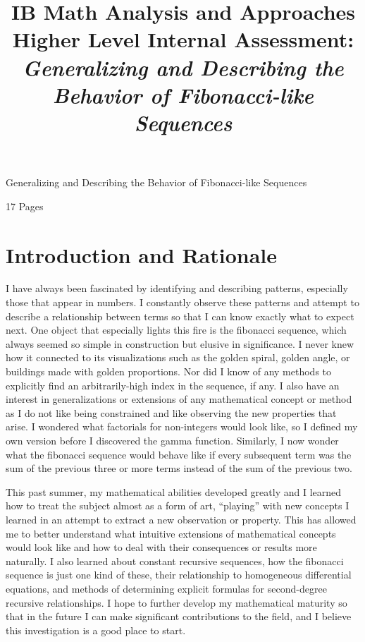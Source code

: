 \documentclass[11pt]{article}
\title{IB Math Analysis and Approaches Higher Level Internal Assessment: \emph{Generalizing and Describing the Behavior of Fibonacci-like Sequences}}
\begin{document}
\doublespacing
\thispagestyle{empty}

\begin{center}
{\huge Generalizing and Describing the Behavior of Fibonacci-like Sequences} 
\end{center}

\begin{center}
17 Pages
\end{center}

\newpage

\setcounter{page}{1}

\section{Introduction and Rationale}

I have always been fascinated by identifying and describing patterns, especially those that appear in numbers. I constantly observe these patterns and attempt to describe a relationship between terms so that I can know exactly what to expect next. One object that especially lights this fire is the fibonacci sequence, which always seemed so simple in construction but elusive in significance. I never knew how it connected to its visualizations such as the golden spiral, golden angle, or buildings made with golden proportions. Nor did I know of any methods to explicitly find an arbitrarily-high index in the sequence, if any. I also have an interest in generalizations or extensions of any mathematical concept or method as I do not like being constrained and like observing the new properties that arise. I wondered what factorials for non-integers would look like, so I defined my own version before I discovered the gamma function. Similarly, I now wonder what the fibonacci sequence would behave like if every subsequent term was the sum of the previous three or more terms instead of the sum of the previous two. 

This past summer, my mathematical abilities developed greatly and I learned how to treat the subject almost as a form of art, “playing” with new concepts I learned in an attempt to extract a new observation or property. This has allowed me to better understand what intuitive extensions of mathematical concepts would look like and how to deal with their consequences or results more naturally. I also learned about constant recursive sequences, how the fibonacci sequence is just one kind of these, their relationship to homogeneous differential equations, and methods of determining explicit formulas for second-degree recursive relationships. I hope to further develop my mathematical maturity so that in the future I can make significant contributions to the field, and I believe this investigation is a good place to start.
\end{document}
